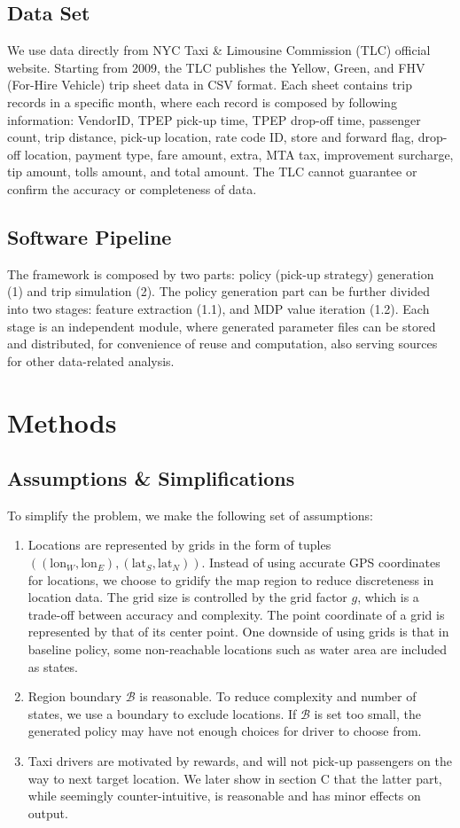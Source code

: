\documentclass[letterpaper, 10 pt, conference]{ieeeconf}
\begin{document}
\subsection{Data Set}
We use data directly from NYC Taxi \& Limousine Commission (TLC) official website\cite{tlc}. Starting from 2009, the TLC publishes the Yellow, Green, and FHV (For-Hire Vehicle) trip sheet data in CSV format. Each sheet contains trip records in a specific month, where each record is composed by following information: VendorID, TPEP pick-up time, TPEP drop-off time, passenger count, trip distance, pick-up location, rate code ID, store and forward flag, drop-off location, payment type, fare amount, extra, MTA tax, improvement surcharge, tip amount, tolls amount, and total amount\cite{rec}. The TLC cannot guarantee or confirm the accuracy or completeness of data. 
\subsection{Software Pipeline}
The framework is composed by two parts: policy (pick-up strategy) generation (1) and trip simulation (2). The policy generation part can be further divided into two stages: feature extraction (1.1), and MDP value iteration (1.2). Each stage is an independent module, where generated parameter files can be stored and distributed, for convenience of reuse and computation, also serving sources for other data-related analysis. 
\section{Methods}
\subsection{Assumptions \& Simplifications}
To simplify the problem, we make the following set of assumptions:
\begin{enumerate}
\item Locations are represented by grids in the form of tuples $((\text{lon}_W, \text{lon}_E), (\text{lat}_S, \text{lat}_N))$. Instead of using accurate GPS coordinates for locations, we choose to gridify the map region to reduce discreteness in location data. The grid size is controlled by the grid factor $g$, which is a trade-off between accuracy and complexity. The point coordinate of a grid is represented by that of its center point. One downside of using grids is that in baseline policy, some non-reachable locations such as water area are included as states.
\item Region boundary $\mathcal{B}$ is reasonable. To reduce complexity and number of states, we use a boundary to exclude locations. If $\mathcal{B}$ is set too small, the generated policy may have not enough choices for driver to choose from.
\item Taxi drivers are motivated by rewards, and will not pick-up passengers on the way to next target location. We later show in section C that the latter part, while seemingly counter-intuitive, is reasonable and has minor effects on output.
\end{enumerate}
\end{document}

